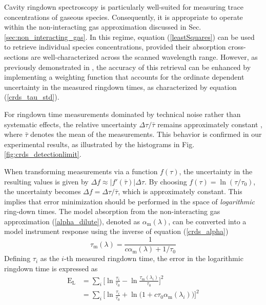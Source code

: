 \documentclass[8pt,a4paper]{report}
\begin{document}
	Cavity ringdown spectroscopy is particularly well-suited for measuring trace concentrations of gaseous species. Consequently, it is appropriate to operate within the non-interacting gas approximation discussed in Sec. \ref{sec:non_interacting_gas}. In this regime, equation (\ref{leastSquares}) can be used to retrieve individual species concentrations, provided their absorption cross-sections are well-characterized across the scanned wavelength range. However, as previously demonstrated in \cite{mine_acetone}, the accuracy of this retrieval can be enhanced by implementing a weighting function that accounts for the ordinate dependent uncertainty in the measured ringdown times, as characterized by equation (\ref{crds_tau_std}).
	
	
	For ringdown time measurements dominated by technical noise rather than systematic effects, the relative uncertainty $\Delta\tau/\bar{\tau}$ remains approximately constant \cite{vanZee_1999}, where $\bar{\tau}$ denotes the mean of the measurements. This behavior is confirmed in our experimental results, as illustrated by the histograms in Fig. \ref{fig:crds_detectionlimit}.
	
	When transforming measurements via a function $f(\tau)$, the uncertainty in the resulting values is given by $\Delta f \approx |f'(\bar{\tau})| \Delta \tau$. By choosing $f(\tau) = \ln(\tau/\tau_0)$, the uncertainty becomes $\Delta f = \Delta \tau/\bar{\tau}$, which is approximately constant. This implies that error minimization should be performed in the space of \textit{logarithmic} ring-down times. The model absorption from the non-interacting gas approximation (\ref{alpha_dilute}), denoted as $\alpha_\mathrm{m}(\lambda)$, can be converted into a model instrument response using the inverse of equation (\ref{crds_alpha})
	\begin{equation}
		\tau_\mathrm{m}(\lambda) = \frac{1}{c\alpha_\mathrm{m}(\lambda) + 1/\tau_0}
	\end{equation}
	Defining $\tau_i$ as the $i$-th measured ringdown time, the error in the logarithmic ringdown time is expressed as
	\begin{align} %
		\mathrm{E}_\mathrm{L} &= \sum_i \Big[\ln \frac{\tau_i}{\tau_0} - \ln\frac{\tau_\mathrm{m}(\lambda_i)}{\tau_0}\Big]^2 \nonumber \\
		&= \sum_i \Big[\ln \frac{\tau_i}{\tau_0} + \ln\big(1+c\tau_0\alpha_\mathrm{m}(\lambda_i)\big)\Big]^2
	\end{align}
		
\end{document}
